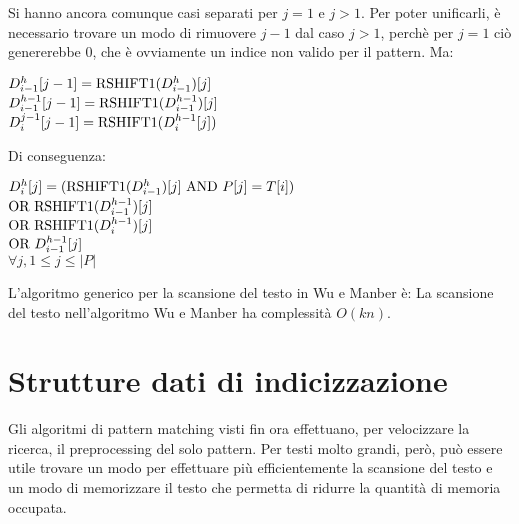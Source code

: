 Si hanno ancora comunque casi separati per $j = 1$ e $j > 1$.
Per poter unificarli, è necessario trovare un modo di rimuovere $j-1$ dal caso $j>1$, perchè per $j = 1$ ciò genererebbe 0, che è ovviamente un indice non valido per il pattern.
Ma:
\begin{center}
    $D_{i-1}^h[j-1] = \textnormal{RSHIFT1}(D_{i-1}^h)[j]$\\
    $D_{i-1}^{h-1}[j-1] = \textnormal{RSHIFT1}(D_{i-1}^{h-1})[j]$\\
    $D_i^{j-1}[j-1] = \textnormal{RSHIFT1}(D_i^{h-1}[j])$
\end{center}
Di conseguenza:
\begin{center}
    $D_i^h[j] = (\textnormal{RSHIFT1}(D_{i-1}^h)[j] \textnormal{ AND } P[j] = T[i])$\\
    $\textnormal{OR } \textnormal{RSHIFT1}(D_{i-1}^{h-1})[j]$\\
    $\textnormal{OR } \textnormal{RSHIFT1}(D_i^{h-1})[j]$\\
    $\textnormal{OR } D_{i-1}^{h-1}[j]$\\
    $\forall j, 1 \le j \le |P|$
\end{center}
L'algoritmo generico per la scansione del testo in Wu e Manber è:
La scansione del testo nell'algoritmo Wu e Manber ha complessità $O(kn)$.


\section{Strutture dati di indicizzazione}
Gli algoritmi di pattern matching visti fin ora effettuano, per velocizzare
la ricerca, il preprocessing del solo pattern.
Per testi molto grandi, però, può essere utile trovare un modo per effettuare
più efficientemente la scansione del testo e un modo di memorizzare il testo
che permetta di ridurre la quantità di memoria occupata.

